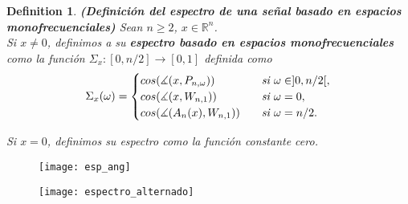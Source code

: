 \documentclass[]{beamer}
\newtheorem{defi}{\bf Definition}
\theoremstyle{definition}
\newcommand{\IR}{\mathbb{R}}
\begin{document}
\begin{frame}
\begin{defi}
\label{def: espectro monofrecuenciales inicial}
\textbf{(Definición del espectro de una señal
basado en espacios monofrecuenciales)}
Sean $n \geq 2$, $x \in \IR^{n}$. \\

Si $x \neq 0$, definimos a su \textbf{espectro basado
en espacios monofrecuenciales} como la función 
$\Sigma_{x}: [0, n/2] \longrightarrow [0,1]$
definida como
\begin{align*}
\Sigma_{x}(\omega)= \begin{cases}
cos(\measuredangle(x, P_{n, \omega})) & 
\hspace{0.2cm} \textit{ si } \omega \in ]0, n/2[, \\
cos(\measuredangle(x, W_{n,1})) & \hspace{0.2cm} \textit{ si } \omega = 0, \\
cos(\measuredangle(A_{n}(x), W_{n,1})) & \hspace{0.2cm} \textit{ si } \omega = n/2.
\end{cases}
\end{align*}

Si $x = 0$, definimos su espectro como la 
función constante cero.
\end{defi}
\end{frame}


\begin{frame}
\begin{figure}[h]
\texttt{[image: esp\_ang]}
\end{figure}
\end{frame}

\begin{frame}
\begin{figure}[h]
\texttt{[image: espectro\_alternado]}
\end{figure}
\end{frame}
\end{document}
